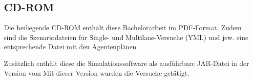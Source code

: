 \newpage

\subsection*{CD-ROM}

Die beiliegende CD-ROM enthält diese Bachelorarbeit im PDF-Format.
Zudem sind die Szenariodateien für Single- und Multilane-Versuche (YML) und jew. eine entsprechende Datei mit den Agentenplänen

Zusätzlich enthält diese die Simulationssoftware als ausführbare JAR-Datei in der Version vom  
Mit dieser Version wurden die Versuche getätigt.